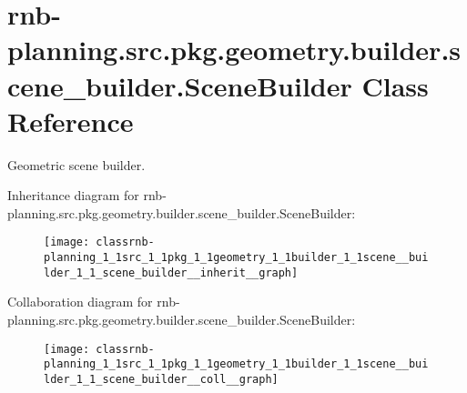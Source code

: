 \hypertarget{classrnb-planning_1_1src_1_1pkg_1_1geometry_1_1builder_1_1scene__builder_1_1_scene_builder}{}\section{rnb-\/planning.src.\+pkg.\+geometry.\+builder.\+scene\+\_\+builder.\+Scene\+Builder Class Reference}
\label{classrnb-planning_1_1src_1_1pkg_1_1geometry_1_1builder_1_1scene__builder_1_1_scene_builder}


Geometric scene builder.  




Inheritance diagram for rnb-\/planning.src.\+pkg.\+geometry.\+builder.\+scene\+\_\+builder.\+Scene\+Builder\+:
\nopagebreak
\begin{figure}[H]
\begin{center}
\leavevmode
\texttt{[image: classrnb-planning\_1\_1src\_1\_1pkg\_1\_1geometry\_1\_1builder\_1\_1scene\_\_builder\_1\_1\_scene\_builder\_\_inherit\_\_graph]}
\end{center}
\end{figure}


Collaboration diagram for rnb-\/planning.src.\+pkg.\+geometry.\+builder.\+scene\+\_\+builder.\+Scene\+Builder\+:
\nopagebreak
\begin{figure}[H]
\begin{center}
\leavevmode
\texttt{[image: classrnb-planning\_1\_1src\_1\_1pkg\_1\_1geometry\_1\_1builder\_1\_1scene\_\_builder\_1\_1\_scene\_builder\_\_coll\_\_graph]}
\end{center}
\end{figure}
